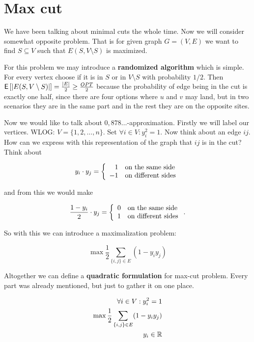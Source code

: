 \chapter{Max cut}

We have been talking about minimal cuts the whole time. Now we will consider somewhat opposite problem. That is for given graph $G = (V,E)$ we want to find $S \subseteq V$ such that $E(S, V \setminus S)$ is maximized.

For this problem we may introduce a \textbf{randomized algorithm} which is simple. For every vertex choose if it is in $S$ or in $V \setminus S$ with probability $1/2$. Then $\operatorname{\textsf{E}\,} [|E(S, V \setminus S)|] = \frac{|E|}{2} \geq \frac{OPT}{2}$ because the probability of edge being in the cut is exactly one half, since there are four options where $u$ and $v$ may land, but in two scenarios they are in the same part and in the rest they are on the opposite sites.

Now we would like to talk about $0,878\dots$-approximation. Firstly we will label our vertices. WLOG: $V = \{1, 2, \dots, n\}$. Set $\forall i \in V: y_{i}^2 =1$. Now think about an edge $ij$. How can we express with this representation of the graph that $ij$ is in the cut? Think about

$$
y_{i} \cdot y_{j} = \left\{
\begin{array}{r l}
	1 & \text{on the same side} \\
	-1 & \text{on different sides}
\end{array}
\right.
$$

and from this we would make

$$
\frac{1 - y_{i}}{2} \cdot y_{j} = \left\{
\begin{array}{r l}
	0 & \text{on the same side} \\
	1 & \text{on different sides}
\end{array}
\right..
$$

So with this we can introduce a maximalization problem:

$$
\max \frac{1}{2} \sum_{\{i,j\} \in E} (1 - y_i y_j)
$$

Altogether we can define a \textbf{quadratic formulation} for max-cut problem. Every part was already mentioned, but just to gather it on one place.

$$
\begin{aligned}
	\forall i \in V: y_{i}^2 = 1 \\
	\max \frac{1}{2} \sum_{\{i,j\} \in E} (1 - y_i y_j) \\
	y_{i} \in \mathbb{R}
\end{aligned}
$$

